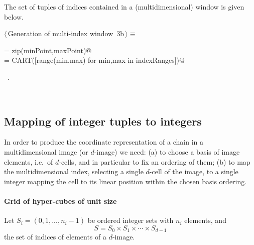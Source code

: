 \documentclass[11pt,oneside]{article}	%
\begin{document}
The set of tuples of indices contained in a (multidimensional) window is given below.
 
\begin{flushleft} \small
\begin{minipage}{\linewidth} \label{scrap5}
\protect{}$\langle\,$Generation of multi-index window\nobreak\ {\footnotesize 3b}$\,\rangle\equiv$
\vspace{-1ex}
\begin{list}{}{} \item
\mbox{}\verb@indexRanges = zip(minPoint,maxPoint)@\\
\mbox{}\verb@tuples = CART([range(min,max) for min,max in indexRanges])@\\
\mbox{}\verb@@{\NWsep}
\end{list}
\vspace{-1ex}
\footnotesize\addtolength{\baselineskip}{-1ex}
\begin{list}{}{\setlength{\itemsep}{-\parsep}\setlength{\itemindent}{-\leftmargin}}
\item \NWtxtMacroRefIn\ .
\end{list}
\end{minipage}\\[4ex]
\end{flushleft}



\subsection{Mapping of integer tuples to integers}

In order to produce the coordinate representation of a chain in a multidimensional image (or $d$-image) we need: (a) to choose a basis of image elements, i.e.~of $d$-cells, and in particular to fix an ordering of them; (b) to map the multidimensional index, selecting a single $d$-cell of the image, to a single integer mapping the cell to its linear position within the chosen basis ordering. 


\paragraph{Grid of hyper-cubes of unit size}
Let $S_i=(0,1,...,n_i-1)$ be ordered integer sets with $n_i$ elements, and 
\[
S= S_0 \times S_1 \times \cdots \times S_{d-1}
\] 
the set of indices of elements of a $d$-image.
\end{document}
